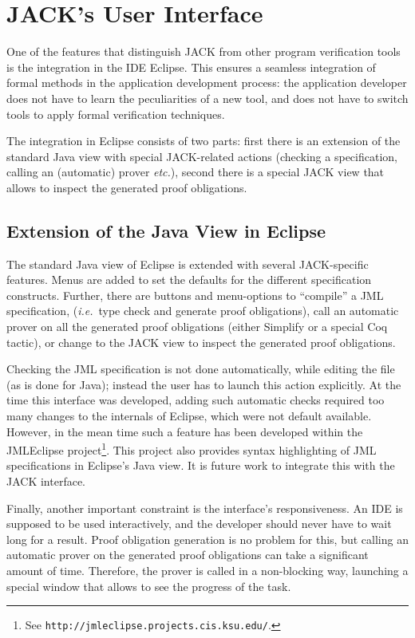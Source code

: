 \section{JACK's User Interface}\label{SecUI}

One of the features that distinguish JACK from other program
verification tools is the integration in the IDE Eclipse. This ensures
a seamless integration of formal methods in the application
development process: the application developer does not have to learn
the peculiarities of a new tool, and does not have to switch tools to
apply formal verification techniques.

The integration in Eclipse consists of two parts: first there is an
extension of the standard Java view with special JACK-related actions
(checking a specification, calling an (automatic) prover \emph{etc.}),
second there is a special JACK view that allows to inspect the
generated proof obligations.

\subsection{Extension of the Java View in Eclipse}

The standard Java view of Eclipse is extended with several
JACK-specific features. Menus are added to set the defaults for the
different specification constructs. Further, there are buttons and
menu-options to ``compile'' a JML specification, (\emph{i.e.}\ type
check and generate proof obligations), call an automatic prover on all
the generated proof obligations (either Simplify or a special
Coq tactic), or change to the JACK view to inspect the
generated proof obligations.

Checking the JML specification is not done automatically, while
editing the file (as is done for Java); instead the user has to launch
this action explicitly. At the time this interface was developed,
adding such automatic checks required too many changes to the
internals of Eclipse, which were not default available. However, in
the mean time such a feature has been developed within the JMLEclipse
project\footnote{See
\texttt{http://jmleclipse.projects.cis.ksu.edu/}.}. This project also
provides syntax highlighting of JML specifications in Eclipse's Java
view. It is future work to integrate this with the JACK interface.

Finally, another important constraint is the interface's
responsiveness. An IDE is supposed to be used interactively, and the
developer should never have to wait long for a result. Proof
obligation generation is no problem for this, but calling an automatic
prover on the generated proof obligations can take a significant
amount of time. Therefore, the prover is called in a non-blocking way,
launching a special window that allows to see the progress of the
task.

